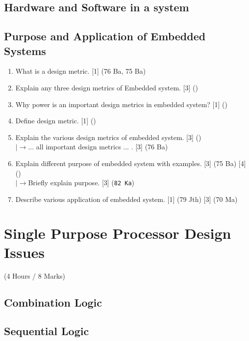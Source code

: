 \documentclass[12pt]{article}
\newcommand{\lb}{\\$\left|\rightarrow\right.$}
\begin{document}
  \subsection{Hardware and Software in a system}
  \subsection{Purpose and Application of Embedded Systems}
    \begin{enumerate}[topsep=0pt, noitemsep]
      \item What is a design metric. \hfill [1] (76 Ba, 75 Ba)

      \item Explain any three design metrics of Embedded system. \hfill [3] () 
      
      \item Why power is an important design metrics in embedded system? \hfill [1] ()

      \item Define design metric. \hfill [1] ()

      \item Explain the various design metrics of embedded system. \hfill [3] ()
      \lb ... all important design metrics ... . \hfill [3] (76 Ba)
      
      \item Explain different purpose of embedded system with examples. \hfill [3] (75 Ba) [4] ()
      \lb Briefly explain purpose. \hfill [3] (\texttt{82 Ka})
      
      \item Describe various application of embedded system. \hfill [1] (79 Jth) [3] (70 Ma)
    \end{enumerate}

\pagebreak

\section{Single Purpose Processor Design Issues}
  \begin{center}(4 Hours / 8 Marks)\end{center}
  
  \subsection{Combination Logic}
  \subsection{Sequential Logic}
\end{document}
